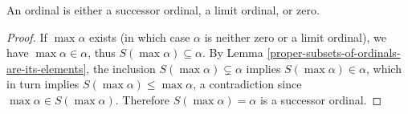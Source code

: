\begin{proposition} \label{ordinal-is-zero-successor-or-limit}
    An ordinal is either a successor ordinal, a limit ordinal, or zero. 
\end{proposition}

\begin{proof}
    If $\max \alpha$ exists (in which case $\alpha$ is neither zero or a limit ordinal), we have $\max \alpha \in \alpha$, thus $S(\max \alpha) \subseteq \alpha$. By Lemma \autoref{proper-subsets-of-ordinals-are-its-elements}, the inclusion $S(\max \alpha) \subsetneq \alpha$ implies $S(\max \alpha) \in \alpha$, which in turn implies $S(\max \alpha) \le \max \alpha$, a contradiction since $\max \alpha \in S(\max \alpha)$. Therefore $S(\max \alpha) = \alpha$ is a successor ordinal.
\end{proof}